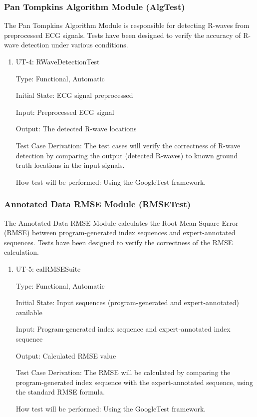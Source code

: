 \documentclass[12pt, titlepage]{article}
\begin{document}
\subsubsection{Pan Tompkins Algorithm Module (AlgTest)}

The Pan Tompkins Algorithm Module is responsible for detecting R-waves from
preprocessed ECG signals. Tests have been designed to verify the accuracy of
R-wave detection under various conditions.

\begin{enumerate}

\item{UT-4: RWaveDetectionTest\\}

Type: Functional, Automatic
					
Initial State: ECG signal preprocessed
					
Input: Preprocessed ECG signal
					
Output: The detected R-wave locations

Test Case Derivation: The test cases will verify the correctness of R-wave
detection by comparing the output (detected R-waves) to known ground truth
locations in the input signals.

How test will be performed: Using the GoogleTest framework.
    
\end{enumerate}

\subsubsection{Annotated Data RMSE Module (RMSETest)}

The Annotated Data RMSE Module calculates the Root Mean Square Error (RMSE)
between program-generated index sequences and expert-annotated sequences. Tests
have been designed to verify the correctness of the RMSE calculation.

\begin{enumerate}

\item{UT-5: calRMSESuite\\}

Type: Functional, Automatic
					
Initial State: Input sequences (program-generated and expert-annotated)
available
					
Input: Program-generated index sequence and expert-annotated index sequence
					
Output: Calculated RMSE value

Test Case Derivation: The RMSE will be calculated by comparing the
program-generated index sequence with the expert-annotated sequence, using the
standard RMSE formula.

How test will be performed: Using the GoogleTest framework.
    
\end{enumerate}
\end{document}
